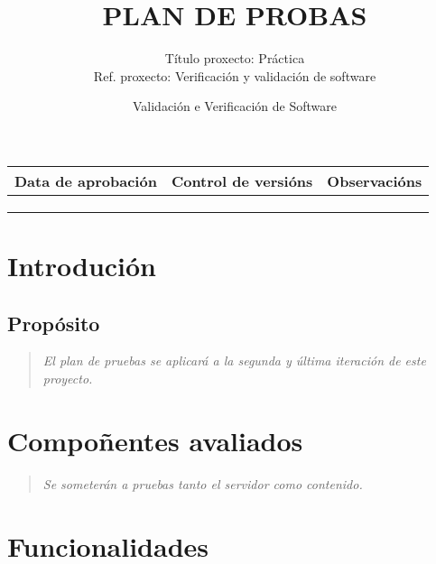 \documentclass[DIV=calc,paper=a4,fontsize=11pt,onecolumn]{scrartcl}	 %
\title{PLAN DE PROBAS} %
\author{Título proxecto: Práctica \\
	Ref. proxecto: Verificación y validación de software}
\date{\sffamily Validación e Verificación de Software} %
\newcommand{\hint}[1]{\begin{quote}\itshape #1 \end{quote}}
\begin{document}
\maketitle %
\thispagestyle{fancy} %


\vspace*{1cm}

\begin{center}
\small \sffamily
\begin{tabular}{c|c|c}
Data de aprobación & Control de versións & Observacións \\ \hline
& & \\ \hline
& & \\ \hline
& & \\
\end{tabular}
\end{center}

\clearpage


\section{Introdución}

\subsection{Propósito}

\hint{El plan de pruebas se aplicará a la segunda y última iteración de este proyecto.}

\section{Compoñentes avaliados}

\hint{Se someterán a pruebas tanto el servidor como contenido.}

\section{Funcionalidades}
\end{document}
